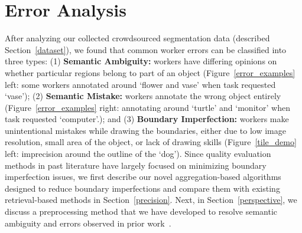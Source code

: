 \vspace{-5pt}
\section{Error Analysis\label{sec:error}}
\par After analyzing our collected crowdsourced segmentation data (described Section~\ref{dataset}), we found that common worker errors can be classified into three types: (1) \textbf{Semantic Ambiguity:} workers have differing opinions on whether particular regions belong to part of an object (Figure~\ref{error_examples} left: some workers annotated around `flower and vase' when task requested `vase'); (2) \textbf{Semantic Mistake:} workers annotate the wrong object entirely (Figure~\ref{error_examples} right: annotating around `turtle' and `monitor' when task requested `computer'.); and (3) \textbf{Boundary Imperfection:} workers make unintentional mistakes while drawing the boundaries, either due to low image resolution, small area of the object, or lack of drawing skills (Figure~\ref{tile_demo} left: imprecision around the outline of the `dog'). Since quality evaluation methods in past literature have largely focused on minimizing boundary imperfection issues, we first describe our novel aggregation-based algorithms designed to reduce boundary imperfections and compare them with existing retrieval-based methods in Section~\ref{precision}. Next, in Section~\ref{perspective}, we discuss a preprocessing method that we have developed to resolve semantic ambiguity and errors observed in prior work~\cite{Sorokin2008,Lin2014,Gurari2018}. 
